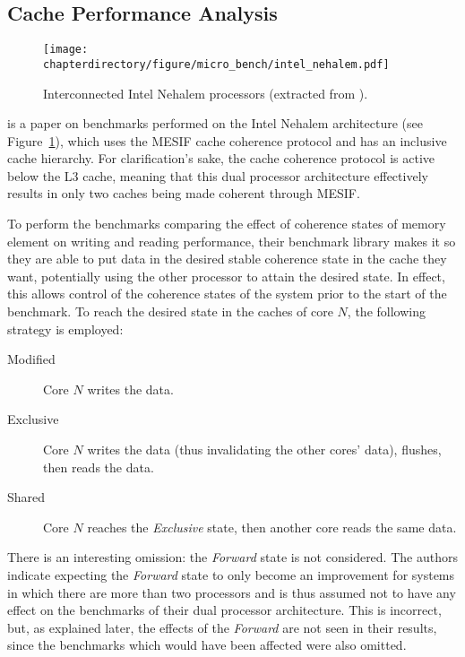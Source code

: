 \subsection{Cache Performance Analysis}
\label{sec:nehalem}

\begin{figure}[hbt!]
\centering
\texttt{[image: \\chapterdirectory/figure/micro\_bench/intel\_nehalem.pdf]}
\caption{%
Interconnected Intel Nehalem processors (extracted from \cite{10.1109/PACT.2009.22}).
}
\label{fig:micro_bench:intel_nehalem}
\end{figure}

\cite{10.1109/PACT.2009.22} is a paper on benchmarks performed on the Intel
Nehalem architecture (see Figure~\ref{fig:micro_bench:intel_nehalem}), which
uses the MESIF cache coherence protocol and has an inclusive cache hierarchy.
For clarification's sake, the cache coherence protocol is active below the L3
cache, meaning that this dual processor architecture effectively results in
only two caches being made coherent through MESIF.

To perform the benchmarks comparing the effect of coherence states of memory
element on writing and reading performance, their benchmark library makes it so
they are able to put data in the desired stable coherence state in the cache
they want, potentially using the other processor to attain the desired state.
In effect, this allows control of the coherence states of the system prior to
the start of the benchmark.  To reach the desired state in the caches of core
$N$, the following strategy is employed:
\begin{description}
\item[Modified] Core $N$ writes the data.
\item[Exclusive] Core $N$ writes the data (thus invalidating the other cores'
data), flushes, then reads the data.
\item[Shared] Core $N$ reaches the \textit{Exclusive} state, then another core
reads the same data.
\end{description}

There is an interesting omission: the \textit{Forward} state is not considered.
The authors indicate expecting the \textit{Forward} state to only become an
improvement for systems in which there are more than two processors and is thus
assumed not to have any effect on the benchmarks of their dual processor
architecture. This is incorrect, but, as explained later, the effects of the
\textit{Forward} are not seen in their results, since the benchmarks which would
have been affected were also omitted.

